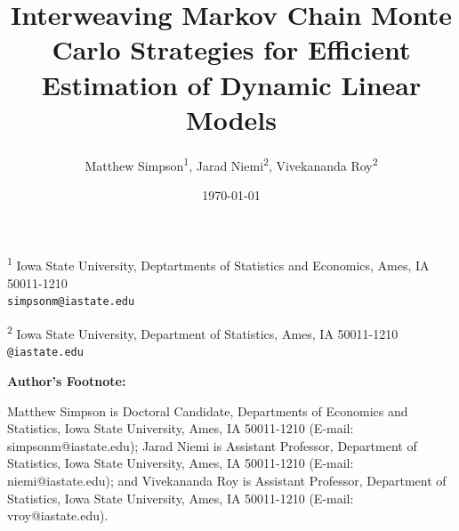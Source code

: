 \documentclass[12pt]{article}
\begin{document}
\title{Interweaving Markov Chain Monte Carlo Strategies for Efficient
Estimation of Dynamic Linear Models}
\author{Matthew Simpson\textsuperscript{1}, Jarad Niemi\textsuperscript{2}, Vivekananda Roy\textsuperscript{2}}
\date{\today}
\maketitle

\begin{center}
 \vspace{-.5em}
 {\small \textsuperscript{1} Iowa State University, Deptartments of Statistics and Economics, Ames, IA 50011-1210\\[-.3em]
 {\tt simpsonm@iastate.edu}}
 
 \vspace{.5em}

{\small \textsuperscript{2} Iowa State University, Department of Statistics, Ames, IA 50011-1210\\[-.3em]
{\tt <niemi,vroy>@iastate.edu}}

\end{center}


\newpage

\mbox{}
\vspace*{2in}
\begin{center}
\textbf{Author's Footnote:}
\end{center}
Matthew Simpson is Doctoral Candidate, Departments of Economics and Statistics, Iowa State University, Ames, IA 50011-1210 (E-mail: simpsonm@iastate.edu); Jarad Niemi is Assistant Professor, Department of Statistics, Iowa State University, Ames, IA 50011-1210 (E-mail: niemi@iastate.edu); and Vivekananda Roy is Assistant Professor, Department of Statistics, Iowa State University, Ames, IA 50011-1210 (E-mail: vroy@iastate.edu). %
\end{document}
